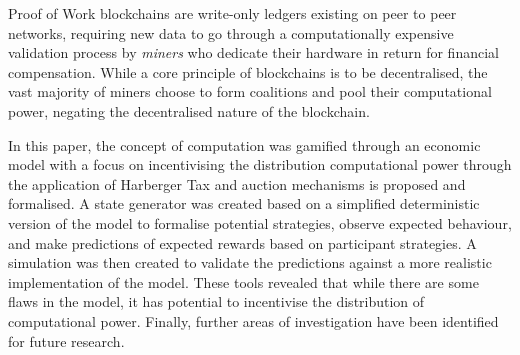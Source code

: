 Proof of Work blockchains are write-only ledgers existing on peer to peer networks, requiring new data to go through a computationally expensive validation process by \textit{miners} who dedicate their hardware in return for financial compensation. While a core principle of blockchains is to be decentralised, the vast majority of miners choose to form coalitions and pool their computational power, negating the decentralised nature of the blockchain. 

In this paper, the concept of computation was gamified through an economic model with a focus on incentivising the distribution computational power through the application of Harberger Tax and auction mechanisms is proposed and formalised. A state generator was created based on a simplified deterministic version of the model to formalise potential strategies, observe expected behaviour, and make predictions of expected rewards based on participant strategies. A simulation was then created to validate the predictions against a more realistic implementation of the model. These tools revealed that while there are some flaws in the model, it has potential to incentivise the distribution of computational power. Finally, further areas of investigation have been identified for future research.
